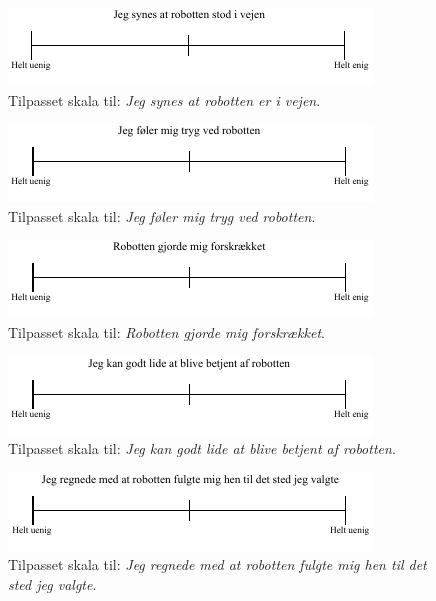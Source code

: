 \noindent
% 
%
\begin{figure}[H]
\centering
\includegraphics[width =\textwidth]{Figure/TilpasningAfSkalaer/TilpassetRobottenErIVejen} 
\caption{Tilpasset skala til: \textit{Jeg synes at robotten er i vejen}.}
\label{fig:TilpasningRobottenErIVejen}
\end{figure}
\noindent
% 
%
\begin{figure}[H]
\centering
\includegraphics[width =\textwidth]{Figure/TilpasningAfSkalaer/TilpassetTrygVedR} 
\caption{Tilpasset skala til: \textit{Jeg føler mig tryg ved robotten}.}
\label{fig:TilpasningTrygVedR}
\end{figure}
\noindent
% 
%
\begin{figure}[H]
\centering
\includegraphics[width =\textwidth]{Figure/TilpasningAfSkalaer/TilpassetForskraekket} 
\caption{Tilpasset skala til: \textit{Robotten gjorde mig forskrækket}.}
\label{fig:TilpasningForskraekket}
\end{figure}
\noindent
% 
%
\begin{figure}[H]
\centering
\includegraphics[width =\textwidth]{Figure/TilpasningAfSkalaer/TilpassetLideBetjening} 
\caption{Tilpasset skala til: \textit{Jeg kan godt lide at blive betjent af robotten}.}
\label{fig:TilpasningLideBetjening}
\end{figure}
\noindent
% 
%
\begin{figure}[H]
\centering
\includegraphics[width =\textwidth]{Figure/TilpasningAfSkalaer/TilpassetRobottenFulgteMigDetRigtigeStedHen} 
\caption{Tilpasset skala til: \textit{Jeg regnede med at robotten fulgte mig hen til det sted jeg valgte}.}
\label{fig:TilpasningRobottenFulgte}
\end{figure}
\noindent
% 
